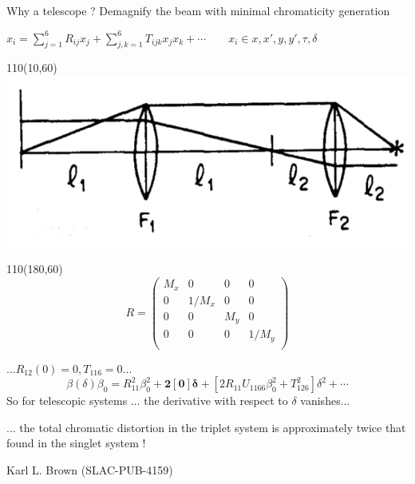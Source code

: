\documentclass{beamer}
\begin{document}
\begin{frame}{Why a telescope ?}
Demagnify the beam with minimal chromaticity generation\par
$x_i=\sum_{j=1}^6R_{ij}x_j+\sum_{j,k=1}^6T_{ijk}x_jx_k+\cdots\qquad x_i\in x,x',y,y',\tau,\delta$\par
\setlength{\TPHorizModule}{1pt}
  \setlength{\TPVertModule}{1pt}
 \begin{textblock}{110}(10,60)
\includegraphics[scale=0.3]{telescope.jpg}
\end{textblock}
\begin{textblock}{110}(180,60)
\begin{equation*}
R=
 \begin{pmatrix}
   M_x & 0 & 0 & 0 \\
   0 & 1/M_x & 0 & 0 \\
   0 & 0 & M_y & 0 \\
   0 & 0 & 0 & 1/M_y \\
  \end{pmatrix}
\end{equation*}
\end{textblock}
\vspace*{2.6cm}
\begin{tcolorbox}[colback=green!5,colframe=green!40!black,title=A Conceptual Design of Final Focus Systems for Linear Colliders]
...$R_{12}(0)=0, T_{116}=0$... 
\begin{equation*}
\beta(\delta)\beta_0 = R_{11}^2\beta_0^2+\boldsymbol{2[0]\delta}+[2R_{11}U_{1166}\beta_0^2+T_{126}^2]\delta^2+\cdots
\end{equation*}
So for telescopic systems ... the derivative with respect to $\delta$ vanishes...\par
... the total chromatic distortion in the triplet system is approximately twice that found in the singlet system !
\end{tcolorbox}
Karl L. Brown (SLAC-PUB-4159)
\end{frame}
\end{document}
